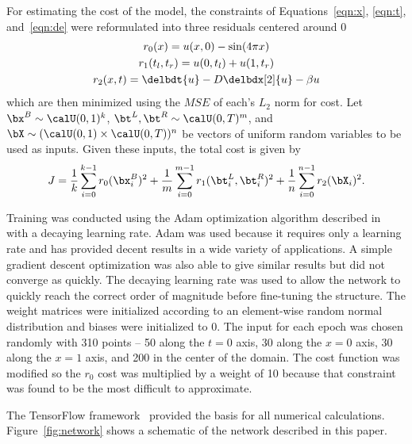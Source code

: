 \documentclass{article}
\begin{document}
      For estimating the cost of the model, the constraints of Equations~\ref{eqn:x}, \ref{eqn:t}, and~\ref{eqn:de} were reformulated into three residuals centered around 0
      \begin{subequations}
      \begin{gather}
        r_0(x) = u(x,0) - \sin(4 \pi x) \label{eqn:res_x} \\
        r_1(t_l, t_r) = u(0,t_l) + u(1,t_r) \label{eqn:res_t} \\
        r_2(x,t) = \delbdt{u} - D \delbdx[2]{u} - \beta u \label{eqn:res_de}
      \end{gather}
      \end{subequations}
      which are then minimized using the $MSE$ of each's $L_2$ norm for cost. Let $\bx^B \sim \calU(0,1)^k$, $\bt^L, \bt^R \sim \calU(0,T)^m$, and $\bX \sim (\calU(0,1) \times \calU(0,T) )^n$ be vectors of uniform random variables to be used as inputs. Given these inputs, the total cost is given by
      \begin{equation} \label{eqn:cost}
        J = \frac1k \sum_{i=0}^{k-1} r_0(\bx^B_i)^2
          + \frac1m \sum_{i=0}^{m-1} r_1(\bt^L_i, \bt^R_i)^2
          + \frac1n \sum_{i=0}^{n-1} r_2(\bX_i)^2.
      \end{equation}

      Training was conducted using the Adam optimization algorithm described in~\cite{adam} with a decaying learning rate. Adam was used because it requires only a learning rate and has provided decent results in a wide variety of applications. A simple gradient descent optimization was also able to give similar results but did not converge as quickly. The decaying learning rate was used to allow the network to quickly reach the correct order of magnitude before fine-tuning the structure. The weight matrices were initialized according to an element-wise random normal distribution and biases were initialized to 0. The input for each epoch was chosen randomly with 310 points -- 50 along the $t=0$ axis, 30 along the $x=0$ axis, 30 along the $x=1$ axis, and 200 in the center of the domain. The cost function was modified so the $r_0$ cost was multiplied by a weight of 10 because that constraint was found to be the most difficult to approximate.

      The TensorFlow framework~\cite{tf} provided the basis for all numerical calculations. Figure~\ref{fig:network} shows a schematic of the network described in this paper.
\end{document}
